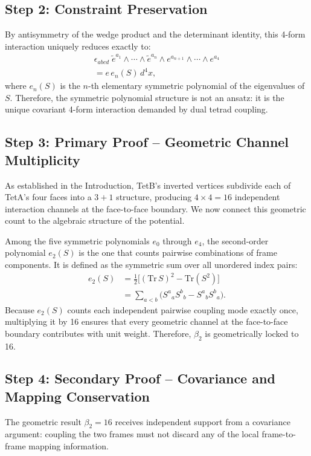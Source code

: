 \documentclass[twocolumn]{iopjournal}
\begin{document}
\subsection*{Step 2: Constraint Preservation}
By antisymmetry of the wedge product and the determinant identity, this 4-form interaction uniquely reduces exactly to:
\begin{multline}
\epsilon_{abcd}\; \tilde{e}^{a_1}\!\wedge \cdots \wedge \tilde{e}^{a_n} \wedge e^{a_{n+1}}\!\wedge \cdots \wedge e^{a_4} \\
= e \, e_n(S)\, d^4x,
\end{multline}
where $e_n(S)$ is the $n$-th elementary symmetric polynomial of the eigenvalues of $S$. Therefore, the symmetric polynomial structure is not an ansatz: it is the unique covariant 4-form interaction demanded by dual tetrad coupling.

\subsection*{Step 3: Primary Proof -- Geometric Channel Multiplicity}
As established in the Introduction, TetB's inverted vertices subdivide each of TetA's four faces into a $3+1$ structure, producing $4 \times 4 = 16$ independent interaction channels at the face-to-face boundary. We now connect this geometric count to the algebraic structure of the potential.

Among the five symmetric polynomials $e_0$ through $e_4$, the second-order polynomial $e_2(S)$ is the one that counts pairwise combinations of frame components. It is defined as the symmetric sum over all unordered index pairs:
\begin{align}
e_2(S) &= \tfrac{1}{2}\bigl[(\mathrm{Tr}\,S)^2 - \mathrm{Tr}(S^2)\bigr] \nonumber \\
&= \sum_{a<b} \bigl( S^a{}_a S^b{}_b - S^a{}_b S^b{}_a \bigr).
\end{align}
Because $e_2(S)$ counts each independent pairwise coupling mode exactly once, multiplying it by 16 ensures that every geometric channel at the face-to-face boundary contributes with unit weight. Therefore, $\beta_2$ is geometrically locked to 16.

\subsection*{Step 4: Secondary Proof -- Covariance and Mapping Conservation}
The geometric result $\beta_2 = 16$ receives independent support from a covariance argument: coupling the two frames must not discard any of the local frame-to-frame mapping information.
\end{document}
